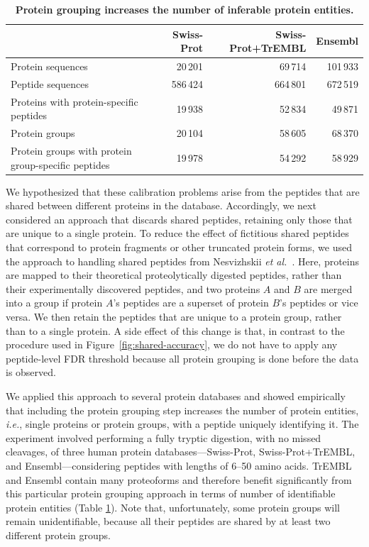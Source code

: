 \documentclass{article}
\begin{document}
\begin{table}
\caption{\label{tab:duplicate-proteins}\textbf{Protein grouping
    increases the number of inferable protein entities.}}
\scriptsize
\begin{center}
\begin{tabular}{lrrr}
\hline
& Swiss-Prot & Swiss-Prot+TrEMBL & Ensembl\\
\hline
Protein sequences & 20\,201 & 69\,714 & 101\,933\\
Peptide sequences & 586\,424 & 664\,801 & 672\,519\\
Proteins with protein-specific peptides & 19\,938 & 52\,834 &
49\,871\\
Protein groups & 20\,104 & 58\,605 & 68\,370\\
Protein groups with protein group-specific peptides & 19\,978 &
54\,292 & 58\,929\\
\hline
\end{tabular}
\end{center}
\end{table}

We hypothesized that these calibration problems arise from the
peptides that are shared between different proteins in the database.
Accordingly, we next considered an approach that discards shared
peptides, retaining only those that are unique to a single protein.
To reduce the effect of fictitious shared peptides that correspond to
protein fragments or other truncated protein forms, we used the
approach to handling shared peptides from Nesvizhskii {\em et
  al.}~\cite{nesvizhskii2003statistical}. Here, proteins are mapped to
their theoretical proteolytically digested peptides, rather than their
experimentally discovered peptides, and two proteins $A$ and $B$ are
merged into a group if protein $A$'s peptides are a superset of
protein $B$'s peptides or vice versa.  We then retain the peptides
that are unique to a protein group, rather than to a single protein.
A side effect of this change is that, in contrast to the procedure
used in Figure~\ref{fig:shared-accuracy}, we do not have to apply any
peptide-level FDR threshold because all protein grouping is done
before the data is observed.

We applied this approach to several protein databases and showed
empirically that including the protein grouping step increases the
number of protein entities, {\em i.e.}, single proteins or protein
groups, with a peptide uniquely identifying it. The experiment
involved performing a fully tryptic digestion, with no missed
cleavages, of three human protein databases---Swiss-Prot,
Swiss-Prot+TrEMBL, and Ensembl---considering peptides with lengths of
6--50 amino acids. TrEMBL and Ensembl contain many proteoforms and
therefore benefit significantly from this particular protein grouping
approach in terms of number of identifiable protein entities (Table
\ref{tab:duplicate-proteins}). Note that, unfortunately, some protein
groups will remain unidentifiable, because all their peptides are
shared by at least two different protein groups.
\end{document}
